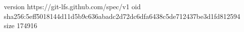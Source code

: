 version https://git-lfs.github.com/spec/v1
oid sha256:5eff5018144d11d5b9c636abadc2d72dc6dfa6438c5de712437be3d1fd812594
size 174916
